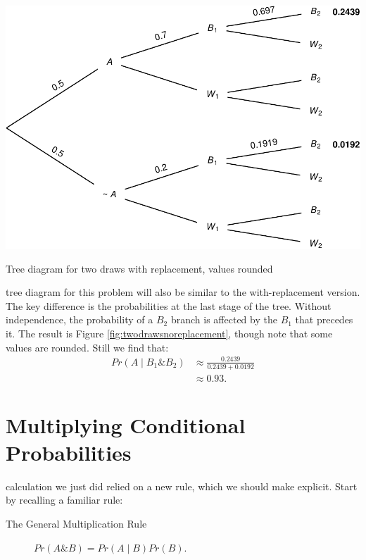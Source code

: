 \documentclass[justified]{tufte-book}
\newcommand{\given}{\mid}
\renewcommand{\wedge}{\mathbin{\&}}
\newcommand{\p}{Pr}
\theoremstyle{definition}
\theoremstyle{definition}
\theoremstyle{definition}
\theoremstyle{remark}
\begin{document}
\begin{marginfigure}
\includegraphics{_main_files/figure-latex/twodrawsnoreplacement-1} \caption[Tree diagram for two draws with replacement, values rounded]{Tree diagram for two draws with replacement, values rounded}\label{fig:twodrawsnoreplacement}
\end{marginfigure}

 tree diagram for this problem will also be similar to
the with-replacement version. The key difference is the probabilities at
the last stage of the tree. Without independence, the probability of a
\(B_2\) branch is affected by the \(B_1\) that precedes it. The result
is Figure \ref{fig:twodrawsnoreplacement}, though note that some values
are rounded. Still we find that: \[
  \begin{aligned}
     \p(A \given B_1 \wedge B_2) &\approx \frac{ 0.2439 }{ 0.2439 + 0.0192 } \\
                                 &\approx 0.93.
  \end{aligned}
\]

\hypertarget{multiplying-conditional-probabilities}{%
\section{Multiplying Conditional
Probabilities}\label{multiplying-conditional-probabilities}}

 calculation we just did relied on a new rule, which we
should make explicit. Start by recalling a familiar rule:

\begin{description}
\item[The General Multiplication Rule]
\(\p(A \wedge B) = \p(A \given B) \p(B).\)
\end{description}
\end{document}
